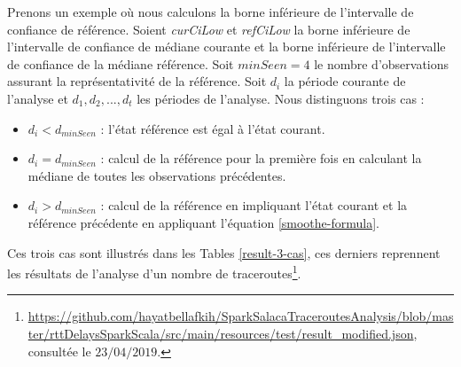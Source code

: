 Prenons un exemple où nous calculons la borne inférieure de l'intervalle de confiance de référence. 
Soient \textit{curCiLow} et \textit{refCiLow} la borne inférieure de l'intervalle de confiance de médiane courante et la borne inférieure de l'intervalle de confiance de la médiane référence.
Soit  $minSeen = 4$ le nombre d'observations assurant la représentativité de la référence. Soit $d_i$ la période courante de l'analyse et $d_1, d_2, ..., d_t$ les périodes de l'analyse. Nous distinguons trois cas :
\begin{itemize}
	\item  $d_i< d_{minSeen}$ : l'état référence est égal à l'état courant.
	\item  $d_i = d_{minSeen}$ : calcul de la référence pour la première fois en calculant la médiane de toutes les observations précédentes.
	\item  $d_i >d_{minSeen}$ : calcul de la référence en impliquant l'état courant et la référence précédente en appliquant l'équation \ref{smoothe-formula}.
\end{itemize}

Ces trois cas sont illustrés dans les  Tables \ref{result-3-cas}, ces derniers reprennent les résultats de l'analyse d'un nombre de traceroutes\footnote{\url{https://github.com/hayatbellafkih/SparkSalacaTraceroutesAnalysis/blob/master/rttDelaysSparkScala/src/main/resources/test/result_modified.json}, consultée  le $23/04/2019$. }.

